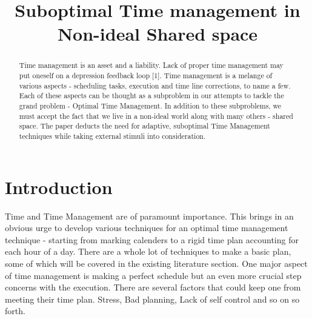 \documentclass[conference]{IEEEtran}
\begin{document}
%
\title{Suboptimal Time management in Non-ideal Shared space}


\author{
}

\maketitle


\begin{abstract}
Time management is an asset and a liability. Lack of proper time management may put oneself on a depression feedback loop [1]. Time management is a melange of various aspects - scheduling tasks, execution and time line corrections, to name a few. Each of these aspects can be thought as a subproblem in our attempts to tackle the grand problem - Optimal Time Management. In addition to these subproblems, we must accept the fact that we live in a non-ideal world along with many others - shared space.  The paper deducts the need for adaptive, suboptimal Time Management techniques while taking external stimuli into consideration.
\end{abstract}


%
\IEEEpeerreviewmaketitle


\section{Introduction}
Time and Time Management are of paramount importance. This brings in an obvious urge to develop various techniques for an optimal time management technique - starting from marking calenders to a rigid time plan accounting for each hour of a day. There are a whole lot of techniques to make a basic plan, some of which will be covered in the existing literature section. One major aspect of time management is making a perfect schedule but an even more crucial step concerns with the execution. There are several factors that could keep one from meeting their time plan. Stress, Bad planning, Lack of self control and so on so forth.
\end{document}
